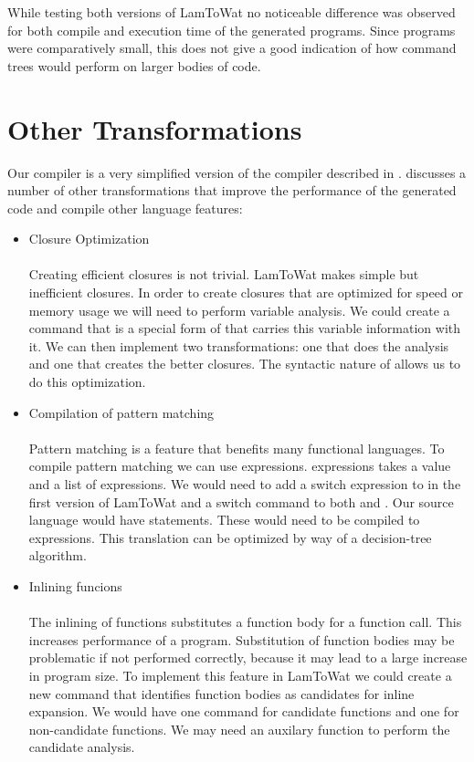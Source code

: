 While testing both versions of LamToWat no noticeable difference was observed for both compile and execution time of the generated programs. Since programs were comparatively small, this does not give a good indication of how command trees would perform on larger bodies of code.

\section{\label{section:othert}Other Transformations}
Our compiler is a very simplified version of the compiler described in  \autocite{DBLP:books/daglib/0022396}. \citeauthor{DBLP:books/daglib/0022396} discusses a number of other transformations that improve the performance of the generated code and compile other language features:

\begin{itemize}
\item Closure Optimization\\\\
Creating efficient closures is not trivial. LamToWat makes simple but inefficient closures. In order to create closures that are optimized for speed or memory usage we will need to perform variable analysis. We could create a command that is a special form of  that carries this variable information with it. We can then implement two transformations: one that does the analysis and one that creates the better closures. The syntactic nature of  allows us to do this optimization.
\item Compilation of pattern matching\\\\
Pattern matching is a feature that benefits many functional languages. To compile pattern matching we can use  expressions.  expressions takes a value and a list of expressions. We would need to add a switch expression to  in the first version of LamToWat and a switch command to both  and . Our source language would have  statements. These would need to be compiled to  expressions. This translation can be optimized by way of a decision-tree algorithm.
\item Inlining funcions\\\\
The inlining of functions substitutes a function body for a function call. This increases performance of a program. Substitution of function bodies may be problematic if not performed correctly, because it may lead to a large increase in program size. To implement this feature in LamToWat we could create a new command that identifies function bodies as candidates for inline expansion. We would have one command for candidate functions and one for non-candidate functions. We may need an auxilary function to perform the candidate analysis.
\end{itemize}
